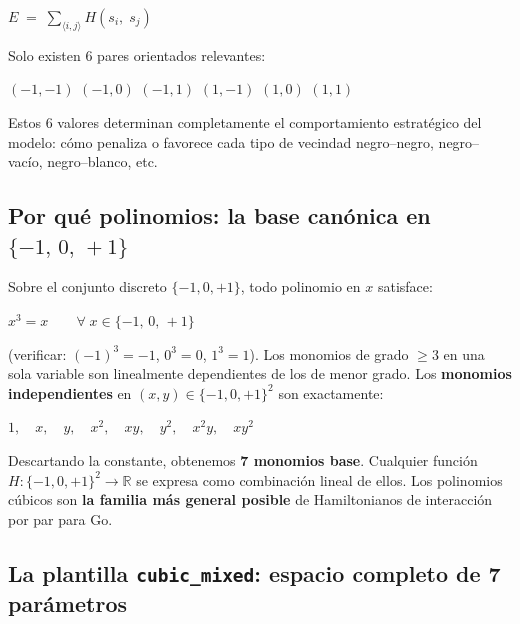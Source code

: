 \documentclass[11pt, a4paper]{article}
\begin{document}
\begin{tcolorbox}[codebox]
$\displaystyle E \;=\; \sum_{\langle i,j \rangle} H(s_i,\; s_j)$
\end{tcolorbox}

Solo existen 6 pares orientados relevantes:

\begin{tcolorbox}[codebox]
$(-1,-1)$ \quad $(-1,0)$ \quad $(-1,1)$
\quad $( 1,-1)$ \quad $( 1, 0)$ \quad $( 1, 1)$
\end{tcolorbox}

Estos 6 valores determinan completamente el comportamiento estrat\'egico del
modelo: c\'omo penaliza o favorece cada tipo de vecindad negro--negro,
negro--vac\'io, negro--blanco, etc.

\subsection{Por qu\'e polinomios: la base can\'onica en $\{-1,\,0,\,+1\}$}

Sobre el conjunto discreto $\{-1, 0, +1\}$, todo polinomio en $x$ satisface:

\begin{tcolorbox}[codebox]
$x^3 = x \qquad \forall\; x \in \{-1,\, 0,\, +1\}$
\end{tcolorbox}

\noindent
(verificar: $(-1)^3=-1$,\; $0^3=0$,\; $1^3=1$). Los monomios de grado
$\geq 3$ en una sola variable son linealmente dependientes de los de menor
grado. Los \textbf{monomios independientes} en $(x,y)\in\{-1,0,+1\}^2$ son
exactamente:

\begin{tcolorbox}[codebox]
$1,\quad x,\quad y,\quad x^2,\quad xy,\quad y^2,\quad x^2y,\quad xy^2$
\end{tcolorbox}

Descartando la constante, obtenemos \textbf{7 monomios base}. Cualquier funci\'on
$H\colon\{-1,0,+1\}^2\to\mathbb{R}$ se expresa como combinaci\'on lineal de
ellos. Los polinomios c\'ubicos son \textbf{la familia m\'as general posible}
de Hamiltonianos de interacci\'on por par para Go.

\subsection{La plantilla \texttt{cubic\_mixed}: espacio completo de 7 par\'ametros}
\end{document}
